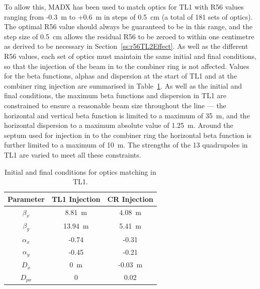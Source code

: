 To allow this, MADX has been used to match optics for TL1 with R56 values ranging from -0.3~m to +0.6~m in steps of 0.5~cm (a total of 181 sets of optics). The optimal R56 value should always be guaranteed to be in this range, and the step size of 0.5~cm allows the residual R56 to be zeroed to within one centimetre as derived to be necessary in Section~\ref{ss:r56TL2Effect}. As well as the different R56 values, each set of optics must maintain the same initial and final conditions, so that the injection of the beam in to the combiner ring is not affected. Values for the beta functions, alphas and dispersion at the start of TL1 and at the combiner ring injection are summarised in Table~\ref{t:tl1MatchParams}. As well as the initial and final conditions, the maximum beta functions and dispersion in TL1 are constrained to ensure a reasonable beam size throughout the line --- the horizontal and vertical beta function is limited to a maximum of 35~m, and the horizontal dispersion to a maximum absolute value of 1.25~m. Around the septum used for injection in to the combiner ring the horizontal beta function is further limited to a maximum of 10~m. The strengths of the 13 quadrupoles in TL1 are varied to meet all these constraints.

\begin{table}
  \begin{center}
    \begin{tabular}{| c c c |}
	   \hline
       Parameter & TL1 Injection & CR Injection \\ \hline
       \(\beta_x\) & 8.81~m & 4.08~m \\
       \(\beta_y\) & 13.94~m & 5.41~m \\
       \(\alpha_x\) & -0.74 & -0.31 \\
       \(\alpha_y\) & -0.45 & -0.21 \\ 
       \(D_x\) & 0~m & -0.03~m \\ 
       \(D_{px}\) & 0 & 0.02 \\ \hline
    \end{tabular}
    \caption{Initial and final conditions for optics matching in TL1.}
  	\label{t:tl1MatchParams}
  \end{center}
\end{table}

